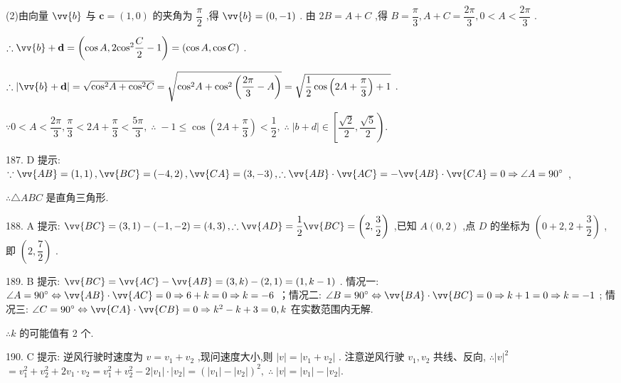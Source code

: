 (2)由向量 $\vv{b}$ 与 $\mathbf{c} = \left( {1,0}\right)$ 的夹角为 $\dfrac{\pi }{2}$ ,得 $\vv{b} = \left( {0, - 1}\right)$ . 由 ${2B} = A + C$ ,得 $B = \dfrac{\pi }{3},A + C = \dfrac{2\pi }{3},0 < A < \dfrac{2\pi }{3}$ .

$\therefore \vv{b} + \mathbf{d} = \left( {\cos A,2{\cos }^{2}\dfrac{C}{2} - 1}\right)  = \left( {\cos A,\cos C}\right)$ .

$\therefore \left| {\vv{b} + \mathbf{d}}\right|  = \sqrt{{\cos }^{2}A + {\cos }^{2}C} = \sqrt{{\cos }^{2}A + {\cos }^{2}\left( {\dfrac{2\pi }{3} - A}\right) } = \sqrt{\dfrac{1}{2}\cos \left( {{2A} + \dfrac{\pi }{3}}\right)  + 1}$ .

$\because 0 < A < \dfrac{2\pi }{3},\dfrac{\pi }{3} < {2A} + \dfrac{\pi }{3} < \dfrac{5\pi }{3},\;\therefore \; - 1 \leq  \cos \left( {{2A} + \dfrac{\pi }{3}}\right)  < \dfrac{1}{2},\;\therefore \;\left| {b + d}\right|  \in  \left\lbrack  {\dfrac{\sqrt{2}}{2},\dfrac{\sqrt{5}}{2}}\right) .$

187. D 提示: $\because \vv{AB} = \left( {1,1}\right) ,\vv{BC} = \left( {-4,2}\right) ,\vv{CA} = \left( {3, - 3}\right) ,\therefore \vv{AB} \cdot  \vv{AC} =  - \vv{AB} \cdot  \vv{CA} = 0 \Rightarrow  \angle A = {90}^{ \circ  }$ ,

$\therefore \bigtriangleup {ABC}$ 是直角三角形.

188. A 提示: $\vv{BC} = \left( {3,1}\right)  - \left( {-1, - 2}\right)  = \left( {4,3}\right) ,\therefore \vv{AD} = \dfrac{1}{2}\vv{BC} = \left( {2,\dfrac{3}{2}}\right)$ ,已知 $A\left( {0,2}\right)$ ,点 $D$ 的坐标为 $\left( {0 + 2,2 + \dfrac{3}{2}}\right)$ , 即 $\left( {2,\dfrac{7}{2}}\right)$ .

189. B 提示: $\vv{BC} = \vv{AC} - \vv{AB} = \left( {3,k}\right)  - \left( {2,1}\right)  = \left( {1,k - 1}\right)$ . 情况一: $\angle A = {90}^{ \circ  } \Leftrightarrow  \vv{AB} \cdot  \vv{AC} = 0 \Rightarrow  6 + k = 0 \Rightarrow  k =  - 6$ ；情况二: $\angle B = {90}^{ \circ  } \Leftrightarrow  \vv{BA} \cdot  \vv{BC} = 0 \Rightarrow  k + 1 = 0 \Rightarrow  k =  - 1$ ; 情况三: $\angle C = {90}^{ \circ  } \Leftrightarrow  \vv{CA} \cdot  \vv{CB} = 0 \Rightarrow  {k}^{2} - k + 3 = 0,k$ 在实数范围内无解.

$\therefore k$ 的可能值有 2 个.

190. C 提示: 逆风行驶时速度为 $v = {v}_{1} + {v}_{2}$ ,现问速度大小,则 $\left| v\right|  = \left| {{v}_{1} + {v}_{2}}\right|$ . 注意逆风行驶 ${v}_{1},{v}_{2}$ 共线、反向, $\therefore {\left| v\right| }^{2}$  $= {v}_{1}^{2} + {v}_{2}^{2} + 2{v}_{1} \cdot  {v}_{2} = {v}_{1}^{2} + {v}_{2}^{2} - 2\left| {v}_{1}\right|  \cdot  \left| {v}_{2}\right|  = {\left( \left| {v}_{1}\right|  - \left| {v}_{2}\right| \right) }^{2},\;\therefore \;\left| v\right|  = \left| {v}_{1}\right|  - \left| {v}_{2}\right| .$

